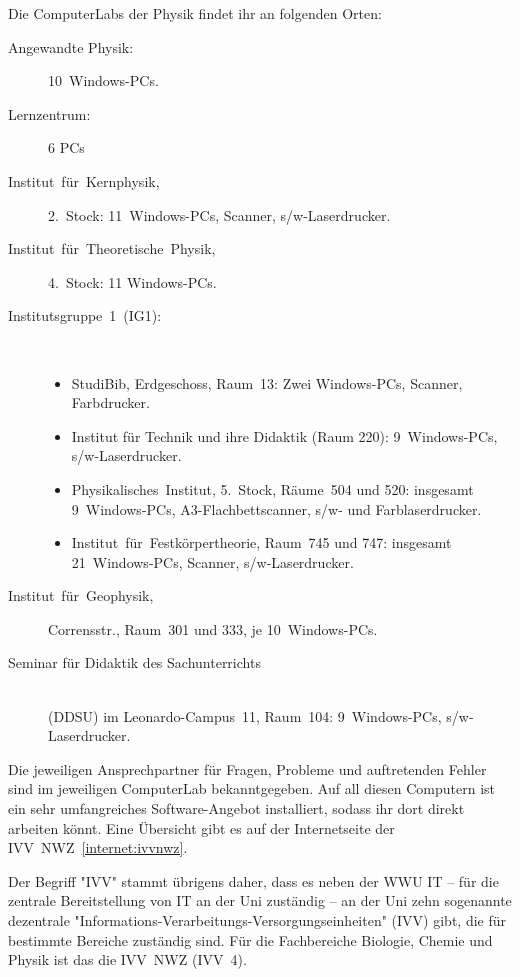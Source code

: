 \begin{multicols*}{2}
Die ComputerLabs der Physik findet ihr an folgenden Orten:
\begin{description}
	\item[Angewandte Physik:] 10~Windows-PCs.
	\item[Lernzentrum:] 6 PCs
	\item[Institut~für~Kernphysik,] 2.~Stock: 11~Windows-PCs, Scanner, s/w-Laserdrucker.
	\item[Institut~für~Theoretische~Physik,] 4.~Stock: 11 Windows-PCs.
	\item[Institutsgruppe~1~(IG1):]~
		\begin{itemize}[leftmargin=1mm]
			\item StudiBib, Erdgeschoss, Raum~13: Zwei Windows-PCs, Scanner, Farbdrucker.
			\item Institut für Technik und ihre Didaktik (Raum 220): 9~Windows-PCs, s/w-Laserdrucker.
			\item Physikalisches~Institut, 5.~Stock, Räume~504 und 520: insgesamt 9~Windows-PCs, A3-Flachbettscanner, s/w- und Farblaserdrucker.
			\item Institut~für~Festkörpertheorie, Raum~745 und 747: insgesamt 21~Windows-PCs, Scanner, s/w-Laserdrucker.
		\end{itemize}
	\item[Institut~für~Geophysik,] Corrensstr., Raum~301 und 333, je 10~Windows-PCs.
	\item[Seminar für Didaktik des Sachunterrichts]~\\(DDSU) im Leonardo-Campus~11, Raum~104: 9~Windows-PCs, s/w-Laserdrucker.
\end{description}

Die jeweiligen Ansprechpartner für Fragen, Probleme und auftretenden Fehler sind im jeweiligen ComputerLab bekanntgegeben.
Auf all diesen Computern ist ein sehr umfangreiches Software-Angebot installiert, sodass ihr dort direkt arbeiten könnt.
Eine Übersicht gibt es auf der Internetseite der IVV~NWZ~\cref{internet:ivvnwz}.

Der Begriff "IVV" stammt übrigens daher, dass es neben der WWU IT -- für die zentrale Bereitstellung von IT an der Uni zuständig -- an der Uni zehn sogenannte dezentrale "Informations-Verarbeitungs-Versorgungseinheiten" (IVV) gibt, die für bestimmte Bereiche zuständig sind.
Für die Fachbereiche Biologie, Chemie und Physik ist das die IVV~NWZ (IVV~4).



\end{multicols*}
